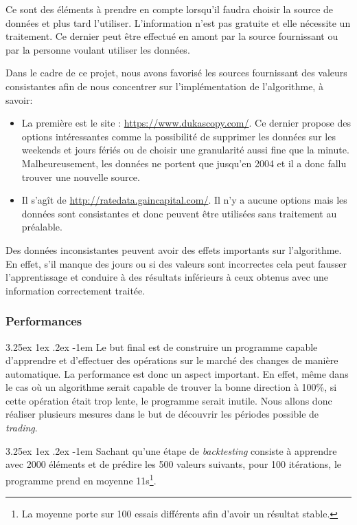 \documentclass[a4paper, 11pt]{article}
\makeatletter
\renewcommand\paragraph{\@startsection{paragraph}{5}{\z@}%
  {3.25ex \@plus1ex \@minus.2ex}%
  {-1em}%
  {\normalfont\normalsize\bfseries}}
\makeatother
\begin{document}
Ce sont des éléments à prendre en compte lorsqu'il faudra choisir la source de données et plus tard l'utiliser. L'information n'est pas gratuite et elle nécessite un traitement. Ce dernier peut être effectué en amont par la source fournissant ou par la personne voulant utiliser les données.

Dans le cadre de ce projet, nous avons favorisé les sources fournissant des valeurs consistantes afin de nous concentrer sur l'implémentation de l'algorithme, à savoir:
\begin{itemize}
	\item La première est le site : \url{https://www.dukascopy.com/}. Ce dernier propose des options intéressantes comme la possibilité de supprimer les données sur les weekends et jours fériés ou de choisir une granularité aussi fine que la minute. Malheureusement, les données ne portent que jusqu'en 2004 et il a donc fallu trouver une nouvelle source.
	\item Il s'agît de \url{http://ratedata.gaincapital.com/}. Il n'y a aucune options mais les données sont consistantes et donc peuvent être utilisées sans traitement au préalable.
\end{itemize}

Des données inconsistantes peuvent avoir des effets importants sur l'algorithme. En effet, s'il manque des jours ou si des valeurs sont incorrectes cela peut fausser l'apprentissage et conduire à des résultats inférieurs à ceux obtenus avec une information correctement traitée.

\subsubsection{Performances}
\paragraph{}
Le but final est de construire un programme capable d'apprendre et d'effectuer des opérations sur le marché des changes de manière automatique. La performance est donc un aspect important. En effet, même dans le cas où un algorithme serait capable de trouver la bonne direction à 100\%, si cette opération était trop lente, le programme serait inutile. Nous allons donc réaliser plusieurs mesures dans le but de découvrir les périodes possible de \textit{trading}.

\paragraph{}
Sachant qu'une étape de \textit{backtesting} consiste à apprendre avec 2000 éléments et de prédire les 500 valeurs suivants, pour 100 itérations, le programme prend en moyenne 11s\footnote{La moyenne porte sur 100 essais différents afin d'avoir un résultat stable.}.
\end{document}
